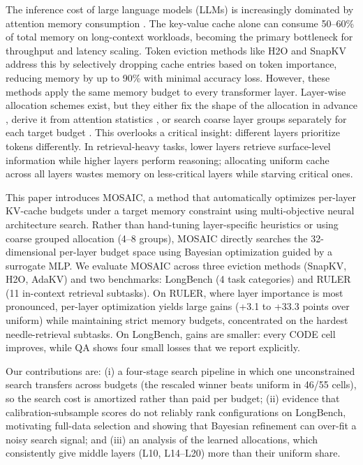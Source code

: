 \documentclass[11pt]{article}
\begin{document}
The inference cost of large language models (LLMs) is increasingly dominated by attention memory consumption \citep{dao2022flashattention}. The key-value cache alone can consume 50–60\% of total memory on long-context workloads, becoming the primary bottleneck for throughput and latency scaling. Token eviction methods like H2O \citep{zhang2023h2o} and SnapKV \citep{li2024snapkv} address this by selectively dropping cache entries based on token importance, reducing memory by up to 90\% with minimal accuracy loss. However, these methods apply the same memory budget to every transformer layer. Layer-wise allocation schemes exist, but they either fix the shape of the allocation in advance \citep{cai2024pyramidkv}, derive it from attention statistics \citep{qin2025cake}, or search coarse layer groups separately for each target budget \citep{yu2025evolkv}. This overlooks a critical insight: different layers prioritize tokens differently. In retrieval-heavy tasks, lower layers retrieve surface-level information while higher layers perform reasoning; allocating uniform cache across all layers wastes memory on less-critical layers while starving critical ones.

This paper introduces MOSAIC, a method that automatically optimizes per-layer KV-cache budgets under a target memory constraint using multi-objective neural architecture search. Rather than hand-tuning layer-specific heuristics or using coarse grouped allocation (4–8 groups), MOSAIC directly searches the 32-dimensional per-layer budget space using Bayesian optimization guided by a surrogate MLP. We evaluate MOSAIC across three eviction methods (SnapKV, H2O, AdaKV) and two benchmarks: LongBench (4 task categories) and RULER (11 in-context retrieval subtasks). On RULER, where layer importance is most pronounced, per-layer optimization yields large gains (+3.1 to +33.3 points over uniform) while maintaining strict memory budgets, concentrated on the hardest needle-retrieval subtasks. On LongBench, gains are smaller: every CODE cell improves, while QA shows four small losses that we report explicitly.

Our contributions are: (i) a four-stage search pipeline in which one unconstrained search transfers across budgets (the rescaled winner beats uniform in 46/55 cells), so the search cost is amortized rather than paid per budget; (ii) evidence that calibration-subsample scores do not reliably rank configurations on LongBench, motivating full-data selection and showing that Bayesian refinement can over-fit a noisy search signal; and (iii) an analysis of the learned allocations, which consistently give middle layers (L10, L14–L20) more than their uniform share.
\end{document}
